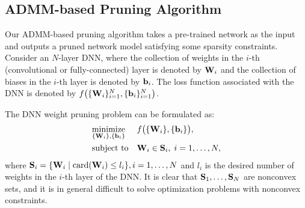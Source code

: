 \documentclass{article} %
\begin{document}




\subsection{ADMM-based Pruning Algorithm}\label{sec:regularization}

Our ADMM-based pruning algorithm takes a pre-trained network as the input and outputs a pruned network model satisfying some sparsity constraints.
Consider an $N$-layer DNN, where the collection of weights in the $i$-th (convolutional or fully-connected) layer is denoted by ${\bf{W}}_{i}$ and the collection of biases in the $i$-th layer is denoted by ${\bf{b}}_{i}$. The loss function associated with the DNN is denoted by $f \big( \{{\bf{W}}_{i}\}_{i=1}^N, \{{\bf{b}}_{i} \}_{i=1}^N \big)$. 

The DNN weight pruning problem can be formulated as:
\begin{equation}
\begin{aligned}
& \underset{ \{{\bf{W}}_{i}\},\{{\bf{b}}_{i} \}}{\text{minimize}}
& & f \big( \{{\bf{W}}_{i} \}, \{{\bf{b}}_{i} \} \big),
\\ & \text{subject to}
& & {\bf{W}}_{i}\in {\bf{S}}_{i}, \; i = 1, \ldots, N,
\end{aligned}
\end{equation}
where ${\bf{S}}_{i}= \{{\bf{W}}_i\mid \mathrm{card}({\bf{W}}_i)\le l_{i}  \}, i=1,\dots,N$ and $l_{i}$ is the desired number of weights in the $i$-th layer of the DNN. It is clear that ${\bf{S}}_{1},\dots,{\bf{S}}_{N}$ are nonconvex sets, and it is in general difficult to solve optimization problems with nonconvex constraints. 
\end{document}

